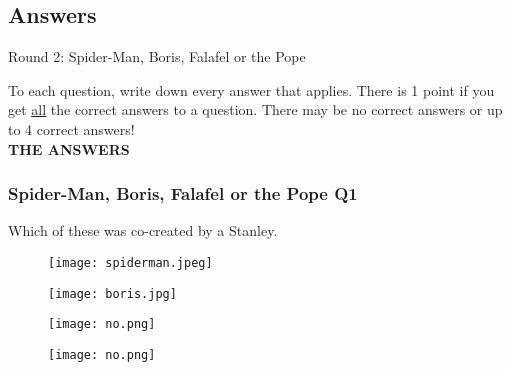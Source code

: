\documentclass{beamer}
\begin{document}
\subsection{Answers}


\begin{frame}
\centering
\Huge
Round 2: Spider-Man, Boris, Falafel or the Pope\vspace{20pt}

\small
To each question, write down every answer that applies. There is 1 point if you get \underline{all} the correct answers to a question. \newline 
There may be no correct answers or up to 4 correct answers!\\
\large
\textbf{THE ANSWERS}
\end{frame}



\begin{frame}
\frametitle{Spider-Man, Boris, Falafel or the Pope Q1}
Which of these was co-created by a Stanley.
\begin{figure}[!htb]
    \centering
    \begin{minipage}{.5\textwidth}
        \centering
        \texttt{[image: spiderman.jpeg]}
        
    \end{minipage}%
    \begin{minipage}{0.5\textwidth}
        \centering
        \texttt{[image: boris.jpg]}
        
    \end{minipage}
\end{figure}
\begin{figure}[!htb]
    \centering
    \begin{minipage}{.5\textwidth}
        \centering
        \texttt{[image: no.png]}
        
    \end{minipage}%
    \begin{minipage}{0.5\textwidth}
        \centering
        \texttt{[image: no.png]}
        
    \end{minipage}
\end{figure}
\end{frame}
\end{document}
